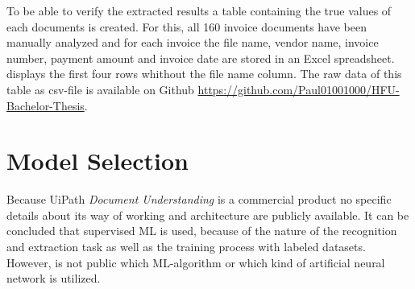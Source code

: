 To be able to verify the extracted results a table containing the true values of each documents is created.
For this, all 160 invoice documents have been manually analyzed and for each invoice the file name, vendor name, invoice number, payment amount and invoice date are stored in an Excel spreadsheet.  displays the first four rows whithout the file name column. The raw data of this table as csv-file is available on Github \url{https://github.com/Paul01001000/HFU-Bachelor-Thesis}. \\

\begin{table}[ht]
    \centering
    \caption{First 4 rows of data verification table}
    \label{tab:db}
\end{table}

\newpage
\section{Model Selection}
Because UiPath \textit{Document Understanding} is a commercial product no specific details about its way of working and architecture are publicly available. It can be concluded that supervised \acf{ML} is used, because of the nature of the recognition and extraction task as well as the training process with labeled datasets. However, is not public which \ac{ML}-algorithm or which kind of artificial neural network is utilized.
